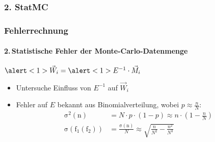 \documentclass{beamer}
\begin{document}
\subsubsection{2. StatMC}
\begin{frame}
	\frametitle{Fehlerrechnung}
	\framesubtitle{2.\,Statistische Fehler der Monte-Carlo-Datenmenge}
	$
	\alert<1>{\vec{W}_i}
	=
	\alert<1>{E^{-1}}
	\cdot
	\vec{M}_i
	$\\
	\begin{itemize}
		\item<1-> Untersuche Einfluss von $E^{-1}$ auf $\vec{W}_i$
		\item<2-> Fehler auf $E$ bekannt aus Binomialverteilung, wobei $p\approx\frac{n}{N}$:\\
		\begin{align*}
			\mathrm{\sigma^2(n)}
				&= N\cdot p \cdot (1-p)
				\approx n\cdot(1 - \frac{n}{N})\\	
			\mathrm{\sigma(f_1(f_2))}
				&= \frac{\mathrm{\sigma(n)}}{N}	
				\approx \sqrt{\frac{n}{N^2} - \frac{n^2}{N^3}}
		\end{align*}
	\end{itemize}
\end{frame}
\end{document}
